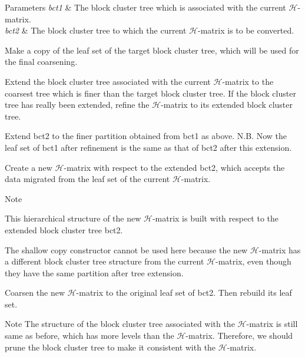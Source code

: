 \begin{DoxyParams}{Parameters}
{\em bct1} & The block cluster tree which is associated with the current $\mathcal{H}$-\/matrix. \\
\hline
{\em bct2} & The block cluster tree to which the current $\mathcal{H}$-\/matrix is to be converted. \\
\hline
\end{DoxyParams}
Make a copy of the leaf set of the target block cluster tree, which will be used for the final coarsening.

Extend the block cluster tree associated with the current $\mathcal{H}$-\/matrix to the coarsest tree which is finer than the target block cluster tree. If the block cluster tree has really been extended, refine the $\mathcal{H}$-\/matrix to its extended block cluster tree.

Extend {\ttfamily bct2} to the finer partition obtained from {\ttfamily bct1} as above. N.\+B. Now the leaf set of {\ttfamily bct1} after refinement is the same as that of {\ttfamily bct2} after this extension.

Create a new $\mathcal{H}$-\/matrix with respect to the extended {\ttfamily bct2}, which accepts the data migrated from the leaf set of the current $\mathcal{H}$-\/matrix.


\begin{DoxyDescription}
\item[Note ]
\begin{DoxyItemize}
\item This hierarchical structure of the new $\mathcal{H}$-\/matrix is built with respect to the extended block cluster tree {\ttfamily bct2}. 
\item The shallow copy constructor cannot be used here because the new $\mathcal{H}$-\/matrix has a different block cluster tree structure from the current $\mathcal{H}$-\/matrix, even though they have the same partition after tree extension. 
\end{DoxyItemize}
\end{DoxyDescription}

Coarsen the new $\mathcal{H}$-\/matrix to the original leaf set of {\ttfamily bct2}. Then rebuild its leaf set.


\begin{DoxyDescription}
\item[Note ]The structure of the block cluster tree associated with the $\mathcal{H}$-\/matrix is still same as before, which has more levels than the $\mathcal{H}$-\/matrix. Therefore, we should prune the block cluster tree to make it consistent with the $\mathcal{H}$-\/matrix. 
\end{DoxyDescription}

